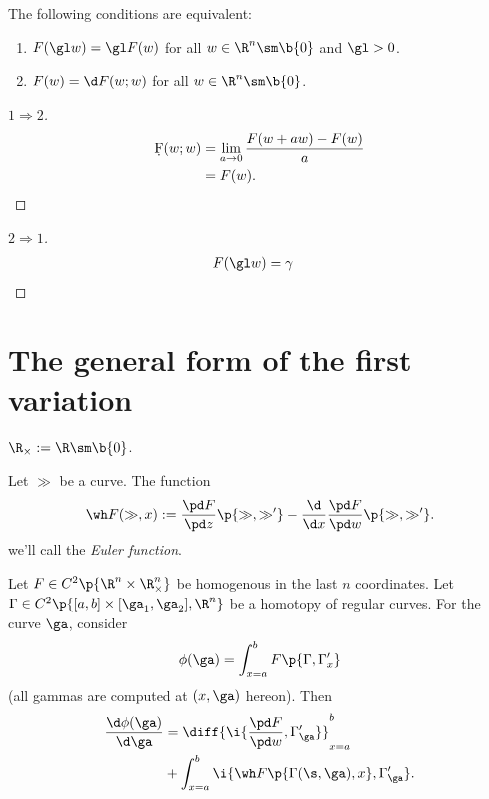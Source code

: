 \begin{lemma}
  The following conditions are equivalent:
  \begin{enumerate}
    \item $F(\gl w) = \gl F(w)$ for all $w \in \R^n \sm \b{0}$ and $\gl > 0$.
    \item $F(w) = \d F(w; w)$ for all $w \in \R^n \sm \b{0}$.
  \end{enumerate}
\end{lemma}

\begin{proof}[$1 \Rightarrow 2$]
  \begin{align*}
    \d F(w; w)
    &= \lim_{a \to 0} \frac{F(w+aw)-F(w)}{a} \\
    &= F(w).
  \end{align*}
\end{proof}

\begin{proof}[$2 \Rightarrow 1$]
  \begin{align*}
    F(\gl w)
    &= \gamma 
  \end{align*}
\end{proof}

\section{The general form of the first variation}

\begin{definition}
  $\R_\times := \R \sm \b{0}$.
\end{definition}

\begin{definition}
  Let $\gg$ be a curve. The function
  \begin{align*}
    \wh F(\gg, x) := \frac{\pd F}{\pd z}\p{\gg, \gg'} - \frac{\d}{\d x} \frac{\pd F}{\pd w} \p{\gg, \gg'}.
  \end{align*}
  we'll call the \emph{Euler function}.
\end{definition}

\begin{theorem}
  \label{general form of the first variation}
  Let $F \in C^2 \p{\R^n \times \R^n_\times}$ be homogenous in the last $n$ coordinates.
  Let $\Gamma \in C^2 \p{[a, b] \times [\ga_1, \ga_2], \R^n}$ be a homotopy of regular curves.
  For the curve $\ga$, consider
  $$ \phi(\ga) = \int_{x=a}^b F\p{\Gamma, \Gamma_x'} $$
  (all gammas are computed at $(x, \ga)$ hereon).
  Then
  \begin{align*}
    \frac{\d \phi(\ga)}{\d \ga}
    &= \diff{ \i{\frac{\pd F}{\pd w}, \Gamma'_\ga} }_{x=a}^b \\
    &+\int_{x=a}^b \i{\wh F\p{\Gamma(\s, \ga), x}, \Gamma'_\ga }.
  \end{align*}
\end{theorem}

